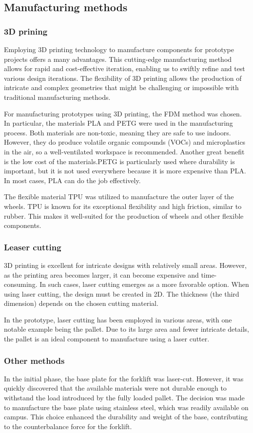 \documentclass[../report.tex]{subfiles}
\begin{document}
\subsection{Manufacturing methods}
\subsubsection{3D prining}
    Employing 3D printing technology to manufacture components for prototype
    projects offers a many advantages. This cutting-edge manufacturing method
    allows for rapid and cost-effective iteration, enabling us to swiftly refine
    and test various design iterations. The flexibility of 3D printing allows the
    production of intricate and complex geometries that might be challenging or
    impossible with traditional manufacturing methods.

    For manufacturing prototypes using 3D printing, the FDM method was chosen.
    In particular, the materials PLA and PETG were used in the manufacturing
    process. Both materials are non-toxic, meaning they are safe to use
    indoors. However, they do produce volatile organic compounds (VOCs) and
    microplastics in the air, so a well-ventilated workspace is recommended.
    Another great benefit is the low cost of the materials.PETG is particularly
    used where durability is important, but it is not used everywhere because
    it is more expensive than PLA. In most cases, PLA can do the job
    effectively.

    The flexible material TPU was utilized to manufacture the outer layer of
    the wheels. TPU is known for its exceptional flexibility and high friction,
    similar to rubber. This makes it well-suited for the production of wheels
    and other flexible components.
\subsubsection{Leaser cutting}
    3D printing is excellent for intricate designs with relatively small areas.
    However, as the printing area becomes larger, it can become expensive and
    time-consuming. In such cases, laser cutting emerges as a more favorable
    option. When using laser cutting, the design must be created in 2D. The
    thickness (the third dimension) depends on the chosen cutting material.

    In the prototype, laser cutting has been employed in various areas, with
    one notable example being the pallet. Due to its large area and fewer
    intricate details, the pallet is an ideal component to manufacture using a
    laser cutter.

\subsubsection{Other methods}
    In the initial phase, the base plate for the forklift was laser-cut.
    However, it was quickly discovered that the available materials were not
    durable enough to withstand the load introduced by the fully loaded pallet.
    The decision was made to manufacture the base plate using stainless steel,
    which was readily available on campus. This choice enhanced the durability
    and weight of the base, contributing to the counterbalance force for the
    forklift.
\end{document}
